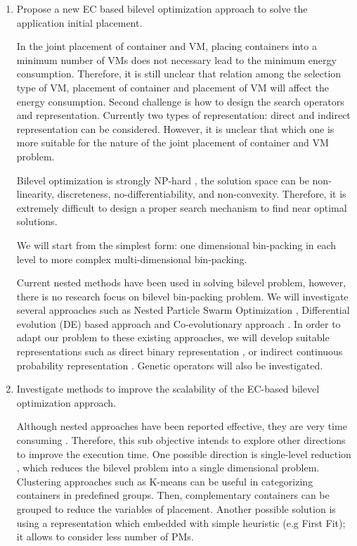 \begin{enumerate}
	\item Propose a new EC based bilevel optimization approach to solve the application initial placement.

	 In the joint placement of container and VM, placing containers into a minimum number of VMs does not necessary lead to the minimum energy consumption. Therefore, it is still unclear that relation among the selection type of VM, placement of container and placement of VM will affect the energy consumption. Second challenge is how to design the search operators and representation. Currently two types of representation: direct and indirect representation can be considered. However, it is unclear that which one is more suitable for the nature of the joint placement of container and VM problem.

	 Bilevel optimization is strongly NP-hard \cite{Mathieu:2011dw}, the solution space can be non-linearity, discreteness, no-differentiability, and non-convexity. Therefore, it is extremely difficult to design a proper search mechanism to find near optimal solutions.



	We will start from the simplest form: one dimensional bin-packing in each level to more complex multi-dimensional bin-packing. 

	Current nested methods have been used in solving bilevel problem, however, there is no research focus on bilevel bin-packing problem. We will investigate several approaches such as Nested Particle Swarm Optimization \cite{Li:2006br}, Differential evolution (DE) based approach \cite{Angelo:2013ee, Zhu:2006in} and Co-evolutionary approach \cite{Legillon:2012dd}. In order to adapt our problem to these existing approaches, we will develop suitable representations such as direct binary representation \cite{Xu:2010vh}, or indirect continuous probability representation \cite{Xiong:2014jq}. Genetic operators will also be investigated.

	\item Investigate methods to improve the scalability of the EC-based bilevel optimization approach.

	 Although nested approaches have been reported effective, they are very time consuming \cite{Sinha:2017et}. Therefore, this sub objective intends to explore other directions to improve the execution time. One possible direction is single-level reduction \cite{Sinha:2017et}, which reduces the bilevel problem into a single dimensional problem. Clustering approaches such as K-means \cite{Xie:2011fj} can be useful in categorizing containers in predefined groups. Then, complementary containers can be grouped to reduce the variables of placement. Another possible solution is using a representation which embedded with simple heuristic (e.g First Fit); it allows to consider less number of PMs.  


\end{enumerate}

